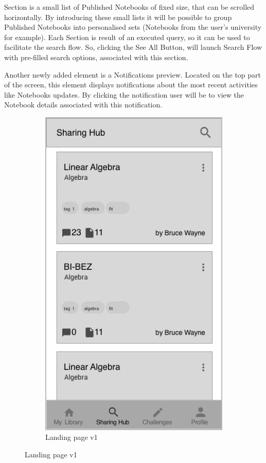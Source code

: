 \documentclass[thesis=B,english]{FITthesis}[2012/10/20]
\begin{document}
Section is a small list of Published Notebooks of fixed size, that can be scrolled horizontally. By introducing these small lists it will be possible to group Published Notebooks into personalised sets (Notebooks from the user's university for example). Each Section is result of an executed query, so it can be used to facilitate the search flow. So, clicking the See All Button, will launch Search Flow with pre-filled search options, associated with this section.

Another newly added element is a Notifications preview. Located on the top part of the screen, this element displays notifications about the most recent activities like Notebooks updates. By clicking the notification user will be to view the Notebook details associated with this notification.


\begin{figure}[H]
\centering
\begin{subfigure}{.5\textwidth}
  \centering
 \includegraphics[scale=0.4]{SharingHub}
  \caption{Landing page v1}
  \label{fig:section-sharinghubv1}

\end{subfigure}
\end{figure}
\end{document}
